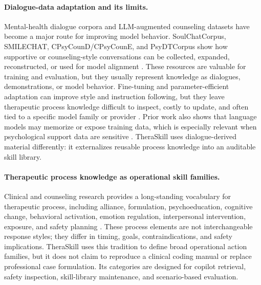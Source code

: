 \documentclass[11pt]{article}
\begin{document}
\paragraph{Dialogue-data adaptation and its limits.}
Mental-health dialogue corpora and LLM-augmented counseling datasets have become a major route for improving model behavior. SoulChatCorpus, SMILECHAT, CPsyCounD/CPsyCounE, and PsyDTCorpus show how supportive or counseling-style conversations can be collected, expanded, reconstructed, or used for model alignment \citep{chen2023soulchat,qiu2024smile,zhang2024cpsycoun,xie2025psydt}. These resources are valuable for training and evaluation, but they usually represent knowledge as dialogues, demonstrations, or model behavior. Fine-tuning and parameter-efficient adaptation can improve style and instruction following, but they leave therapeutic process knowledge difficult to inspect, costly to update, and often tied to a specific model family or provider \citep{hu2022lora}. Prior work also shows that language models may memorize or expose training data, which is especially relevant when psychological support data are sensitive \citep{carlini2021extracting,carlini2023quantifying}. TheraSkill uses dialogue-derived material differently: it externalizes reusable process knowledge into an auditable skill library.

\paragraph{Therapeutic process knowledge as operational skill families.}
Clinical and counseling research provides a long-standing vocabulary for therapeutic process, including alliance, formulation, psychoeducation, cognitive change, behavioral activation, emotion regulation, interpersonal intervention, exposure, and safety planning \citep{bordin1979alliance,lukens2004psychoeducation,beck1979cognitive,jacobson2001behavioral,gross1998emotion,klerman1984ipt,foa1986exposure,stanley2012safety}. These process elements are not interchangeable response styles; they differ in timing, goals, contraindications, and safety implications. TheraSkill uses this tradition to define broad operational action families, but it does not claim to reproduce a clinical coding manual or replace professional case formulation. Its categories are designed for copilot retrieval, safety inspection, skill-library maintenance, and scenario-based evaluation.
\end{document}

